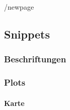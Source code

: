 \documentclass[
]{article}
\let\oldparagraph\paragraph
\renewcommand{\paragraph}[1]{\oldparagraph{#1}\mbox{}}
\begin{document}
/newpage

\hypertarget{snippets}{%
\subsection{Snippets}\label{snippets}}

\hypertarget{beschriftungen}{%
\subsubsection{Beschriftungen}\label{beschriftungen}}

\newpage

\hypertarget{plots}{%
\subsubsection{Plots}\label{plots}}

\hypertarget{karte}{%
\paragraph{Karte}\label{karte}}
\end{document}
